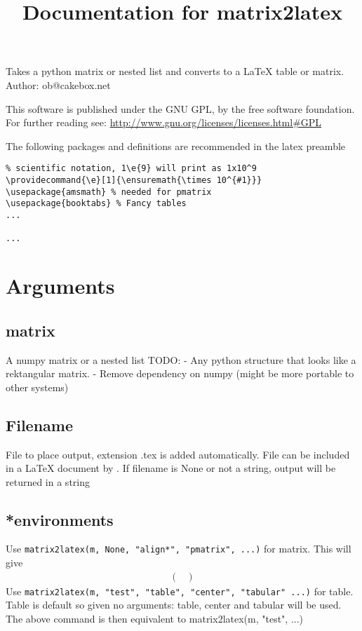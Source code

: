 
\title{Documentation for matrix2latex}


\maketitle
Takes a python matrix or nested list and converts to a LaTeX table or matrix.
Author: ob@cakebox.net

This software is published under the GNU GPL, by the free software
foundation. For further reading see: 
\url{http://www.gnu.org/licenses/licenses.html#GPL}

The following packages and definitions are recommended in the latex preamble 
\begin{verbatim}
% scientific notation, 1\e{9} will print as 1x10^9
\providecommand{\e}[1]{\ensuremath{\times 10^{#1}}}
\usepackage{amsmath} % needed for pmatrix
\usepackage{booktabs} % Fancy tables
...

...
\end{verbatim}

\section{Arguments}
  
\subsection{matrix}
  A numpy matrix or a nested list
  TODO:
  - Any python structure that looks like a rektangular matrix.
  - Remove dependency on numpy (might be more portable to other systems)

\subsection{Filename}
  File to place output, extension .tex is added automatically. File can be included in a LaTeX
  document by \verb!!. If filename is None or not a string, output will be returned in a string
  
\subsection{*environments}
  Use 
\lstinline{matrix2latex(m, None, "align*", "pmatrix", ...)} for matrix.
  This will give
  \begin{align*}
    \begin{pmatrix}
    \end{pmatrix}
  \end{align*}
  Use 
\lstinline{matrix2latex(m, "test", "table", "center", "tabular" ...)} for table.
  Table is default so given no arguments: table, center and tabular will be used.
  The above command is then equivalent to
  matrix2latex(m, "test", ...)
  
